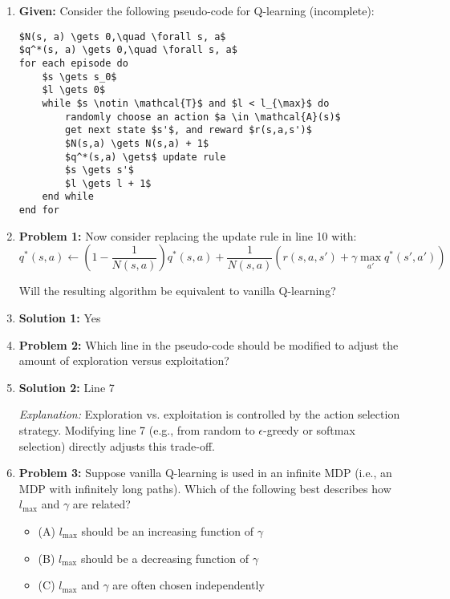 \begin{example}
    \begin{enumerate}

        \item \textbf{Given:} Consider the following pseudo-code for Q-learning (incomplete):
    
\begin{lstlisting}
$N(s, a) \gets 0,\quad \forall s, a$
$q^*(s, a) \gets 0,\quad \forall s, a$
for each episode do
    $s \gets s_0$
    $l \gets 0$
    while $s \notin \mathcal{T}$ and $l < l_{\max}$ do
        randomly choose an action $a \in \mathcal{A}(s)$
        get next state $s'$, and reward $r(s,a,s')$
        $N(s,a) \gets N(s,a) + 1$
        $q^*(s,a) \gets$ update rule
        $s \gets s'$
        $l \gets l + 1$
    end while
end for
\end{lstlisting}
    
        \item \textbf{Problem 1:} Now consider replacing the update rule in line 10 with:
        \[
        q^*(s,a) \gets \left(1 - \frac{1}{N(s,a)}\right) q^*(s,a) + \frac{1}{N(s,a)} \left( r(s,a,s') + \gamma \max_{a'} q^*(s',a') \right)
        \]
    
        Will the resulting algorithm be equivalent to vanilla Q-learning?
    
        \item \textbf{Solution 1:} Yes 
    
        \item \textbf{Problem 2:} Which line in the pseudo-code should be modified to adjust the amount of exploration versus exploitation?
    
        \item \textbf{Solution 2:} Line 7

        \textit{Explanation:} Exploration vs. exploitation is controlled by the action selection strategy. Modifying line 7 (e.g., from random to $\epsilon$-greedy or softmax selection) directly adjusts this trade-off.
    
        \item \textbf{Problem 3:} Suppose vanilla Q-learning is used in an infinite MDP (i.e., an MDP with infinitely long paths). Which of the following best describes how $l_{\max}$ and $\gamma$ are related?
    
        \begin{itemize}
            \item (A) $l_{\max}$ should be an increasing function of $\gamma$
            \item (B) $l_{\max}$ should be a decreasing function of $\gamma$
            \item (C) $l_{\max}$ and $\gamma$ are often chosen independently
        \end{itemize}
    

\end{enumerate}
\end{example}

